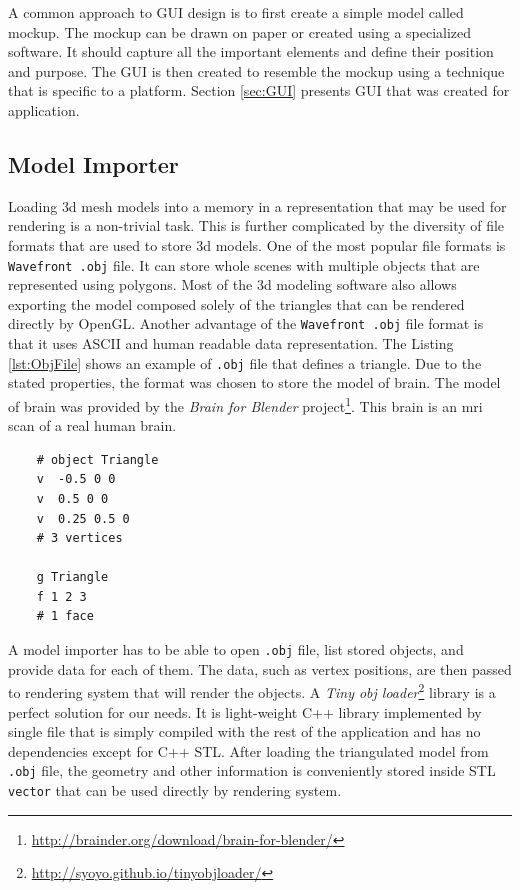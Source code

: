 A common approach to GUI design is to first create a simple model called mockup. The mockup can be drawn on paper or created using a specialized software. It should capture all the important elements and define their position and purpose. The GUI is then created to resemble the mockup using a technique that is specific to a platform. Section \ref{sec:GUI} presents GUI that was created for application. 

\subsection{Model Importer}
Loading \gls{3d} mesh models into a memory in a representation that may be used for rendering is a non-trivial task. This is further complicated by the diversity of file formats that are used to store \gls{3d} models. One of the most popular file formats is \texttt{Wavefront .obj} file. It can store whole scenes with multiple objects that are represented using polygons. Most of the \gls{3d} modeling software also allows exporting the model composed solely of the triangles that can be rendered directly by OpenGL. Another advantage of the \texttt{Wavefront .obj} file format is that it uses ASCII and human readable data representation. The Listing \ref{lst:ObjFile} shows an example of \texttt{.obj} file that defines a triangle. Due to the stated properties, the format was chosen to store the model of brain. The model of brain was provided by the \emph{Brain for Blender} project\footnote{\url{http://brainder.org/download/brain-for-blender/}}. This brain is an \gls{mri} scan of a real human brain.

\lstset{captionpos=b, caption=The .obj file example, label=lst:ObjFile}
\begin{lstlisting}
	# object Triangle
	v  -0.5 0 0
	v  0.5 0 0
	v  0.25 0.5 0
	# 3 vertices
	
	g Triangle
	f 1 2 3 
	# 1 face
\end{lstlisting}

A model importer has to be able to open \texttt{.obj} file, list stored objects, and provide data for each of them. The data, such as vertex positions, are then passed to rendering system that will render the objects. A \emph{Tiny obj loader}\footnote{\url{http://syoyo.github.io/tinyobjloader/}} library is a perfect solution for our needs. It is light-weight C++ library implemented by single file that is simply compiled with the rest of the application and has no dependencies except for C++ STL. After loading the triangulated model from \texttt{.obj} file, the geometry and other information is conveniently stored inside STL \texttt{vector} that can be used directly by rendering system.

